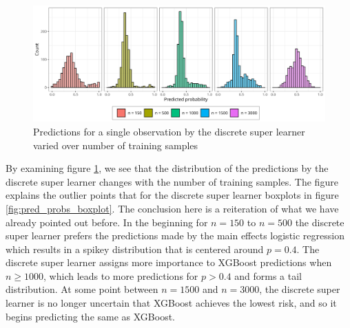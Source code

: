 \documentclass[./main.tex]{subfiles}
\begin{document}
\begin{figure}[H]
    \centering
    \includegraphics[width=\textwidth]{figures/preds_dsl_shift.png}
    \caption{Predictions for a single observation by the discrete super learner varied over number of training samples}
    \label{fig:dsl_shift}
\end{figure}
By examining figure \ref{fig:dsl_shift}, we see that the distribution of the predictions by the discrete super learner changes with the number of training samples. The figure explains the outlier points that for the discrete super learner boxplots in figure \ref{fig:pred_probs_boxplot}. The conclusion here is a reiteration of what we have already pointed out before. In the beginning for $ n = 150 $ to $ n = 500 $ the discrete super learner prefers the predictions made by the main effects logistic regression which results in a spikey distribution that is centered around $ p = 0.4 $. The discrete super learner assigns more importance to XGBoost predictions when $n \geq 1000$, which leads to more predictions for $p > 0.4$ and forms a tail distribution. At some point between $ n = 1500 $ and $ n = 3000 $, the discrete super learner is no longer uncertain that XGBoost achieves the lowest risk, and so it begins predicting the same as XGBoost. 
\end{document}
